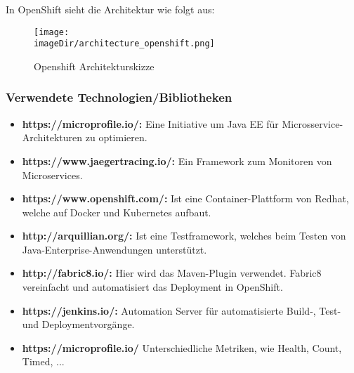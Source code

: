 \documentclass[11pt, a4paper, twoside]{article}   	%
\newcommand{\imageDir}{../../images}
\begin{document}
In OpenShift sieht die Architektur wie folgt aus:
\begin{figure}[h]
	\centering
	\texttt{[image: \\imageDir/architecture\_openshift.png]}
	\caption{Openshift Architekturskizze}
\end{figure}

\subsubsection{Verwendete Technologien/Bibliotheken}
\begin{itemize}
	\item \textbf{https://microprofile.io/:} Eine Initiative um Java EE für Microsservice-Architekturen zu optimieren.
	\item \textbf{https://www.jaegertracing.io/:} Ein Framework zum Monitoren von Microservices.
	\item \textbf{https://www.openshift.com/:} Ist eine Container-Plattform von Redhat, welche auf Docker und Kubernetes aufbaut.
	\item \textbf{http://arquillian.org/:} Ist eine Testframework, welches beim Testen von Java-Enterprise-Anwendungen unterstützt. 
	\item \textbf{http://fabric8.io/:} Hier wird das Maven-Plugin verwendet. Fabric8 vereinfacht und automatisiert das Deployment in OpenShift.
	\item \textbf{https://jenkins.io/:} Automation Server für automatisierte Build-, Test- und Deploymentvorgänge.
	\item \textbf{https://microprofile.io/} Unterschiedliche Metriken, wie Health, Count, Timed, ... 
\end{itemize}
\end{document}
